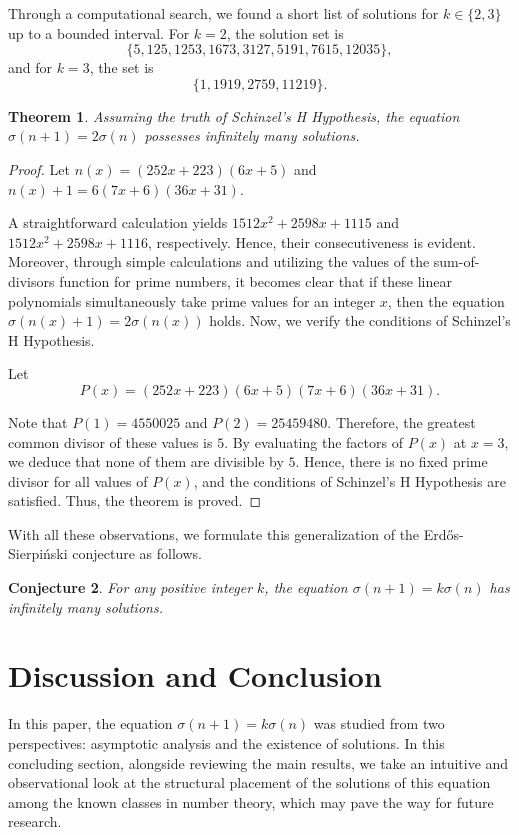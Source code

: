 \documentclass[12pt, a4paper]{article}
\theoremstyle{plain}
\newtheorem{theorem}{Theorem}[section]
\newtheorem{conjecture}[theorem]{Conjecture}
\theoremstyle{definition}
\begin{document}
Through a computational search, we found a short list of solutions for $k \in \{2, 3\}$ up to a bounded interval. For $k = 2$, the solution set is
\[ \{5, 125, 1253, 1673, 3127, 5191, 7615, 12035\}, \]
and for $k = 3$, the set is
\[ \{1, 1919, 2759, 11219\}. \]

\begin{theorem}
Assuming the truth of Schinzel's H Hypothesis, the equation $\sigma(n + 1) = 2\sigma(n)$ possesses infinitely many solutions.
\end{theorem}

\begin{proof}
Let $n(x) = (252x + 223)(6x + 5)$ and $n(x) + 1 = 6(7x + 6)(36x + 31)$.

A straightforward calculation yields $1512x^2 + 2598x + 1115$ and $1512x^2 + 2598x + 1116$, respectively. Hence, their consecutiveness is evident. Moreover, through simple calculations and utilizing the values of the sum-of-divisors function for prime numbers, it becomes clear that if these linear polynomials simultaneously take prime values for an integer $x$, then the equation $\sigma(n(x) + 1) = 2\sigma(n(x))$ holds. Now, we verify the conditions of Schinzel's H Hypothesis.

Let
\[ P(x) = (252x + 223)(6x + 5)(7x + 6)(36x + 31). \]

Note that $P(1) = 4550025$ and $P(2) = 25459480$. Therefore, the greatest common divisor of these values is $5$. By evaluating the factors of $P(x)$ at $x = 3$, we deduce that none of them are divisible by $5$. Hence, there is no fixed prime divisor for all values of $P(x)$, and the conditions of Schinzel's H Hypothesis are satisfied. Thus, the theorem is proved.
\end{proof}

With all these observations, we formulate this generalization of the Erdős-Sierpiński conjecture as follows.

\begin{conjecture}
For any positive integer $k$, the equation $\sigma(n + 1) = k\sigma(n)$ has infinitely many solutions.
\end{conjecture}

\section{Discussion and Conclusion}
In this paper, the equation $\sigma(n + 1) = k\sigma(n)$ was studied from two perspectives: asymptotic analysis and the existence of solutions. In this concluding section, alongside reviewing the main results, we take an intuitive and observational look at the structural placement of the solutions of this equation among the known classes in number theory, which may pave the way for future research.
\end{document}
